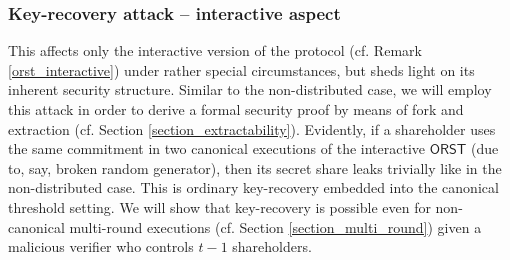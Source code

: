 \documentclass{iacrtrans}
\begin{document}
\subsubsection{Key-recovery attack -- interactive aspect}\label{section_key_recovery_attack}
This affects only
the interactive version of the protocol
(cf. Remark \ref{orst_interactive})
under rather special circumstances,
but sheds light on its inherent security structure.
Similar to the non-distributed case,
we will employ this attack in order to derive
a formal security proof by means of fork and extraction
(cf. Section \ref{section_extractability}).
Evidently, if a shareholder uses the same commitment
in two canonical executions of the interactive $\mathsf{ORST}$
(due to, say, broken random generator),
then its secret share leaks trivially
like in the non-distributed case.
This is ordinary key-recovery
embedded into the canonical threshold setting.
We will show that key-recovery
is possible even for non-canonical multi-round executions
(cf. Section \ref{section_multi_round})
given a malicious verifier who controls $t-1$ shareholders.
\end{document}

